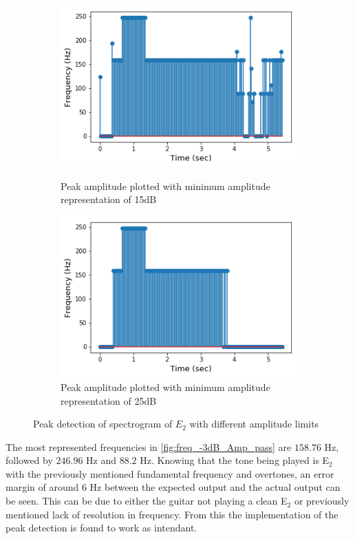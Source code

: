 \begin{figure}[H]
\begin{subfigure}{0.49\textwidth}
\end{subfigure}
\begin{subfigure}{0.49\textwidth}
\centering
\includegraphics[width=\textwidth]{figures/peak_detection/20170511_15.png}
\caption{Peak amplitude plotted with minimum amplitude representation of 15dB}
\label{fig:freq_15dB_Amp_pass}

\includegraphics[width=\textwidth]{figures/peak_detection/20170511_25.png}
\caption{Peak amplitude plotted with minimum amplitude representation of 25dB}
\label{fig:freq_25dB_Amp_pass}

\end{subfigure}
\caption{Peak detection of spectrogram of $E_2$ with different amplitude limits}
\label{fig:valdation_peak_detection}
\end{figure}

The most represented frequencies in \ref{fig:freq_-3dB_Amp_pass} are $158.76$ Hz, followed by $246.96$ Hz and $88.2$ Hz. 
Knowing that the tone being played is E$_2$ with the previously mentioned fundamental frequency and overtones, an error margin of around $6$ Hz between the expected output and the actual output can be seen.
This can be due to either the guitar not playing a clean E$_2$ or previously mentioned lack of resolution in frequency. From this the implementation of the peak detection is found to work as intendant.\\

